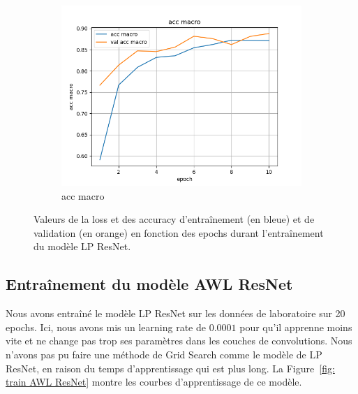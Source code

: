 \documentclass[a4paper]{article}
\begin{document}
\begin{figure}[ht]
\begin{subfigure}{0.32\textwidth}
        \includegraphics[width=\linewidth]{../logs/resnet_img256_0/acc macro.png}
        \caption{acc macro}
    \end{subfigure}
    \caption{Valeurs de la loss et des accuracy d'entraînement (en bleue) et de validation (en orange) en fonction des epochs durant l'entraînement du modèle LP ResNet.}
    \label{fig: train LP ResNet}
\end{figure}

\subsection{Entraînement du modèle AWL ResNet}
Nous avons entraîné le modèle LP ResNet sur les données de laboratoire sur 20 epochs. Ici, nous avons mis un learning rate de $0.0001$ pour qu'il apprenne moins vite et ne change pas trop ses paramètres dans les couches de convolutions. Nous n'avons pas pu faire une méthode de Grid Search comme le modèle de LP ResNet, en raison du temps d'apprentissage qui est plus long. La Figure~\ref{fig: train AWL ResNet} montre les courbes d'apprentissage de ce modèle.
\end{document}
